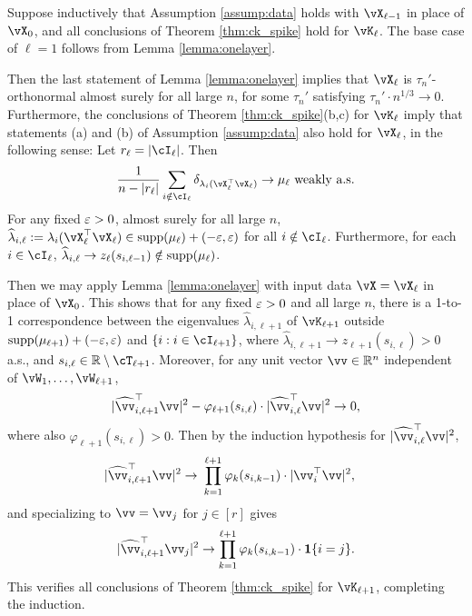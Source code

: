 \begin{proof-of-theorem}[\ref{thm:ck_spike}]
Suppose inductively that Assumption \ref{assump:data}
holds with $\vX_{\ell-1}$ in place of $\vX_0$, and all
conclusions of Theorem \ref{thm:ck_spike} hold for $\vK_\ell$. The base case of
$\ell=1$ follows from Lemma \ref{lemma:onelayer}.

Then the last statement of Lemma \ref{lemma:onelayer} implies that
$\vX_\ell$ is $\tau_n'$-orthonormal almost surely for all large $n$,
for some $\tau_n'$ satisfying $\tau_n' \cdot n^{1/3} \to 0$.
Furthermore, the conclusions of Theorem \ref{thm:ck_spike}(b,c) for $\vK_\ell$
imply that statements (a) and (b) of Assumption \ref{assump:data} also
hold for $\vX_\ell$, in the following sense: Let $r_\ell=|\cI_\ell|$. Then
\[\frac{1}{n-|r_\ell|}\sum_{i \notin \cI_\ell} \delta_{\lambda_i(\vX_\ell^\top
\vX_\ell)} \to \mu_\ell \text{ weakly a.s.}\]
For any fixed $\varepsilon>0$, almost surely for all large $n$,
$\widehat \lambda_{i,\ell}:=
\lambda_i(\vX_\ell^\top \vX_\ell) \in \supp{\mu_\ell}+(-\eps,\eps)$
for all $i \notin \cI_\ell$. Furthermore, for each $i \in \cI_\ell$,
$\widehat \lambda_{i,\ell} \to z_\ell(s_{i,\ell-1}) \notin
\mathrm{supp}({\mu_\ell})$.

Then we may apply Lemma \ref{lemma:onelayer} with input data
$\vX=\vX_\ell$ in place of $\vX_0$. This shows that for any fixed $\varepsilon>0$ and all large $n$, there is a 1-to-1 correspondence between the eigenvalues $\widehat
\lambda_{i,\ell+1}$ of $\vK_{\ell+1}$ outside
$\mathrm{supp}({\mu_{\ell+1}})+(-\varepsilon,\varepsilon)$ and $\{i:i\in\cI_{\ell+1}\}$,
where
$\widehat \lambda_{i,\ell+1}\to z_{\ell+1}\left(s_{i,\ell}\right)>0$ a.s.,
and $s_{i,\ell} \in \R \setminus \cT_{\ell+1}$.
Moreover, for any unit vector $\vv \in \R^n$ independent of
$\vW_1,\ldots,\vW_{\ell+1}$,
	\[|\widehat \vv_{i,\ell+1}^\top
\vv|^2-\varphi_{\ell+1}(s_{i,\ell})\cdot|\widehat \vv_{i,\ell}^\top \vv|^2\to 0,\]
where also $\varphi_{\ell+1}(s_{i,\ell})>0$.
Then by the induction hypothesis for $|\widehat \vv_{i,\ell}^\top \vv|^2$,
	\begin{align*}
	    |\widehat \vv_{i,\ell+1}^\top \vv|^2\to ~& \prod_{k=1}^{\ell+1}
\varphi_{k}(s_{i,k-1}) \cdot |\vv_{i}^\top \vv |^2,
	\end{align*}
and specializing to $\vv=\vv_j$ for $j \in [r]$ gives
	\[|\widehat \vv_{i,\ell+1}^\top \vv_j |^2\to \prod_{k=1}^{\ell+1}
\varphi_{k}(s_{i,k-1}) \cdot \bI\{i=j\}.\]
This verifies all conclusions of Theorem \ref{thm:ck_spike}
for $\vK_{\ell+1}$, completing the induction.
\end{proof-of-theorem}

